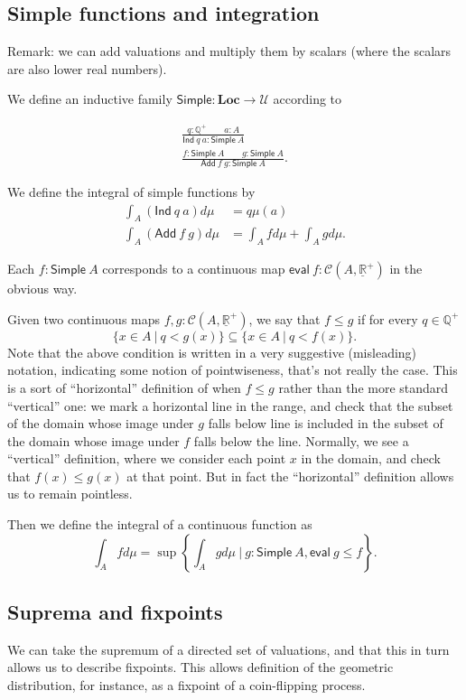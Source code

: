 \documentclass{article}           %
\newcommand{\R}{\mathbb{R}}
\newcommand{\Type}{\mathcal{U}}
\newcommand{\suchthat}{\ |\ }
\begin{document}
\subsection{Simple functions and integration}

Remark: we can add valuations and multiply them by scalars (where the scalars are also lower real numbers).

We define an inductive family $\mathsf{Simple} : \mathbf{Loc} \to \Type$ according to

\begin{gather*}
\frac
{q : \mathbb{Q}^+ \qquad a : A}
{\mathsf{Ind}\ q\ a : \mathsf{Simple}\ A}
\\
\frac
{f : \mathsf{Simple}\ A \qquad g : \mathsf{Simple}\ A }
{\mathsf{Add}\ f\ g : \mathsf{Simple}\ A}.
\end{gather*}

We define the integral of simple functions by
\begin{align*}
   \int_A (\mathsf{Ind}\ q\ a) d\mu &= q \mu(a)
\\ \int_A (\mathsf{Add}\ f\ g) d\mu &= \int_A f d\mu + \int_A g d\mu.
\end{align*}

Each $f : \mathsf{Simple}\ A$ corresponds to a continuous map $\mathsf{eval}\ f: \mathcal{C}(A, \underline{\R}^+)$ in the obvious way.

Given two continuous maps $f, g : \mathcal{C}(A, \underline{\R}^+)$, we say that $f \le g$ if for every $q \in \mathbb{Q}^+$
\[
\{ x \in A \suchthat q < g(x) \} \subseteq \{ x \in A \suchthat q < f(x) \}.
\]
Note that the above condition is written in a very suggestive (misleading) notation, indicating some notion of pointwiseness, that's not really the case. This is a sort of ``horizontal'' definition of when $f \le g$ rather than the more standard ``vertical'' one: we mark a horizontal line in the range, and check that the subset of the domain whose image under $g$ falls below line is included in the subset of the domain whose image under $f$ falls below the line. Normally, we see a ``vertical'' definition, where we consider each point $x$ in the domain, and check that $f(x) \le g(x)$ at that point. But in fact the ``horizontal'' definition allows us to remain pointless.

Then we define the integral of a continuous function as
\[
\int_A f d\mu = \sup \left\{ \int_A g d\mu \suchthat g : \mathsf{Simple}\ A, \mathsf{eval}\ g \le f \right\}.
\]

\subsection{Suprema and fixpoints}
We can take the supremum of a directed set of valuations, and that this in turn allows us to describe fixpoints. This allows definition of the geometric distribution, for instance, as a fixpoint of a coin-flipping process.
\end{document}
